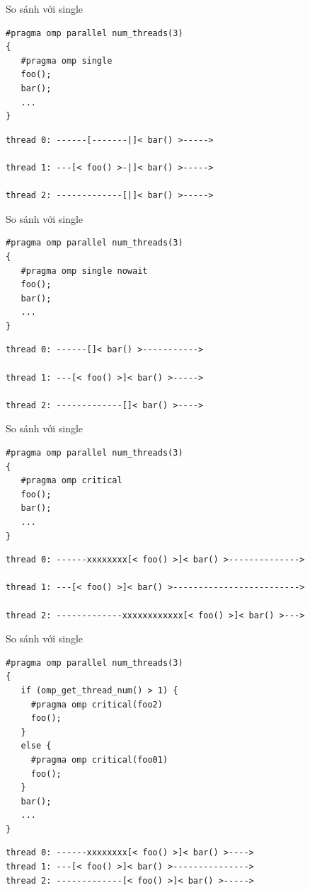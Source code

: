 \documentclass[10pt]{beamer}
\theoremstyle{remark}
\numberwithin{algocf}{section}
\numberwithin{equation}{section}
\numberwithin{dl}{section}
\numberwithin{figure}{section}
\begin{document}
\begin{frame}[fragile]{So sánh với single}
    \begin{verbatim}
#pragma omp parallel num_threads(3)
{
   #pragma omp single
   foo();
   bar();
   ...
}
    \end{verbatim}
    \begin{verbatim}
thread 0: ------[-------|]< bar() >----->

thread 1: ---[< foo() >-|]< bar() >----->

thread 2: -------------[|]< bar() >----->
    \end{verbatim}
\end{frame}

\begin{frame}[fragile]{So sánh với single}
    \begin{verbatim}
#pragma omp parallel num_threads(3)
{
   #pragma omp single nowait
   foo();
   bar();
   ...
}
    \end{verbatim}
    \begin{verbatim}
thread 0: ------[]< bar() >----------->

thread 1: ---[< foo() >]< bar() >----->

thread 2: -------------[]< bar() >---->
    \end{verbatim}
\end{frame}

\begin{frame}[fragile]{So sánh với single}
    \begin{verbatim}
#pragma omp parallel num_threads(3)
{
   #pragma omp critical
   foo();
   bar();
   ...
}
    \end{verbatim}
    \begin{verbatim}
thread 0: ------xxxxxxxx[< foo() >]< bar() >-------------->

thread 1: ---[< foo() >]< bar() >------------------------->

thread 2: -------------xxxxxxxxxxxx[< foo() >]< bar() >--->
    \end{verbatim}
\end{frame}

\begin{frame}[fragile]{So sánh với single}
    \begin{verbatim}
#pragma omp parallel num_threads(3)
{
   if (omp_get_thread_num() > 1) {
     #pragma omp critical(foo2)
     foo();
   }
   else {
     #pragma omp critical(foo01)
     foo();
   }
   bar();
   ...
}
    \end{verbatim}
    \begin{verbatim}
thread 0: ------xxxxxxxx[< foo() >]< bar() >---->
thread 1: ---[< foo() >]< bar() >--------------->
thread 2: -------------[< foo() >]< bar() >----->
    \end{verbatim}
\end{frame}
\end{document}

